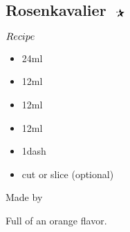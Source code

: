 \subsection{Rosenkavalier $\openbigstar$}
\begin{itembox}[l]{\boldmath $Recipe$}
\begin{itemize}
\setlength{\parskip}{0cm}
\setlength{\itemsep}{0cm}
\item \gin 24ml
\item \vermouth 12ml
\item \oc 12ml
\item \oj 12ml
\item \gs 1dash
\item \orange cut or slice (optional)
\end{itemize}
\vspace{-4mm}
Made by \shake
\end{itembox}
Full of an orange flavor.
